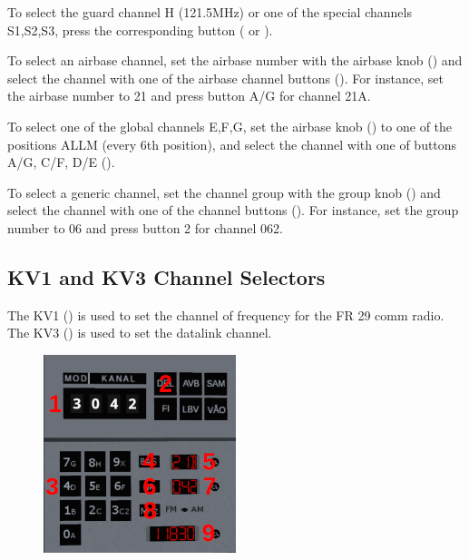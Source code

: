 \documentclass[a4paper]{report}
\begin{document}
{  To select the guard channel H (121.5MHz) or one of the special channels S1,S2,S3,
  press the corresponding button ( or
  ).

  To select an airbase channel, set the airbase number with the airbase knob ()
  and select the channel with one of the airbase channel buttons ().
  For instance, set the airbase number to 21 and press button A/G for channel 21A.

  To select one of the global channels E,F,G, set the airbase knob ()
  to one of the positions ALLM (every 6th position), and select the channel
  with one of buttons A/G, C/F, D/E ().

  To select a generic channel, set the channel group with the group knob ()
  and select the channel with one of the channel buttons ().
  For instance, set the group number to 06 and press button 2 for channel 062.
}{
  \subsection{KV1 and KV3 Channel Selectors}
  The KV1 () is used to set the channel of frequency for the FR 29 comm radio.
  The KV3 () is used to set the datalink channel.

  \begin{figure}[h]
    \centering
    \includegraphics[width=0.5\textwidth]{images/controls/kv1.png}


\end{figure}}
\end{document}
